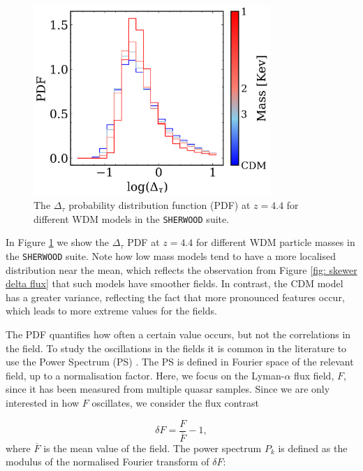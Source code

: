\begin{figure}[ht]
        \centering
            \includegraphics[width=0.8\textwidth]{img/ML/pdf_density_sherwood.png}
            \caption{The $\Delta_\tau$ probability distribution function (PDF) at $z=4.4$ for different WDM models in the \texttt{SHERWOOD} suite.}
            \label{fig: exact density PDF}
\end{figure}


In Figure \ref{fig: exact density PDF} we show the $\Delta_\tau$ PDF at $z=4.4$ for different WDM particle masses in the \texttt{SHERWOOD} suite. Note how low mass models tend to have a more localised distribution near the mean, which reflects the observation from Figure \ref{fig: skewer delta flux} that such models have smoother fields. In contrast, the CDM model has a greater variance, reflecting the fact that more pronounced features occur, which leads to more extreme values for the fields. 

The PDF quantifies how often a certain value occurs, but not the correlations in the field. To study the oscillations in the fields it is common in the literature to use the Power Spectrum (PS) \cite{McDonald_2006,Ravoux_2023}. The PS is defined in Fourier space of the relevant field, up to a normalisation factor. Here, we focus on the Lyman-$\alpha$ flux field, $F$, since it has been measured from multiple quasar samples. Since we are only interested in how $F$ oscillates, we consider the flux contrast

\begin{equation}\label{eq: flux contrast}
        \delta F=\frac{F}{\overline{F}} -1,
\end{equation}
where $\overline{F}$ is the mean value of the field. The power spectrum $P_k$ is defined as the modulus of the normalised Fourier transform of $\delta F$:

